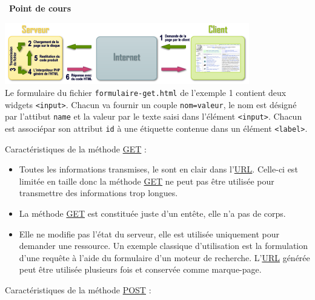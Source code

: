 \documentclass[
  11pt,
]{article}
\newcommand{\passthrough}[1]{#1}
\providecommand{\tightlist}{%
  \setlength{\itemsep}{0pt}\setlength{\parskip}{0pt}}
\newcounter{rque}
\newcounter{cours}
\newenvironment{cours}[1]
{\par \medskip   \addtocounter{cours}{1} \noindent  
\begin{bclogo}[arrondi =0.1,  ombre = true, barre=none, logo=\bcbook, marge=4]{~\textbf{Point de cours} \textbf{\thecours} {\itshape #1} }  \par}
{
\end{bclogo}
 \par \bigskip }
\begin{document}
\begin{cours}{}
\includegraphics[width=0.8\textwidth,height=\textheight]{images/Php_arch_shema.png}\\

Le formulaire du fichier \passthrough{\lstinline!formulaire-get.html!}
de l'exemple 1 contient deux widgets \passthrough{\lstinline!<input>!}.
Chacun va fournir un couple \passthrough{\lstinline!nom=valeur!}, le nom
est désigné par l'attibut \passthrough{\lstinline!name!} et la valeur
par le texte saisi dans l'élément \passthrough{\lstinline!<input>!}.
Chacun est associépar son attribut \passthrough{\lstinline!id!} à une
étiquette contenue dans un élément \passthrough{\lstinline!<label>!}.

Caractéristiques de la méthode
\href{https://developer.mozilla.org/fr/docs/Web/HTTP/M\%C3\%A9thode/GET}{GET}
:

\begin{itemize}
\tightlist
\item
  Toutes les informations transmises, le sont en clair dans
  l'\href{https://developer.mozilla.org/fr/docs/Glossaire/URL}{URL}.
  Celle-ci est limitée en taille donc la méthode
  \href{https://developer.mozilla.org/fr/docs/Web/HTTP/M\%C3\%A9thode/GET}{GET}
  ne peut pas être utilisée pour transmettre des informations trop
  longues.
\item
  La méthode
  \href{https://developer.mozilla.org/fr/docs/Web/HTTP/M\%C3\%A9thode/GET}{GET}
  est constituée juste d'un entête, elle n'a pas de corps.
\item
  Elle ne modifie pas l'état du serveur, elle est utilisée uniquement
  pour demander une ressource. Un exemple classique d'utilisation est la
  formulation d'une requête à l'aide du formulaire d'un moteur de
  recherche.
  L'\href{https://developer.mozilla.org/fr/docs/Glossaire/URL}{URL}
  générée peut être utilisée plusieurs fois et conservée comme
  marque-page.
\end{itemize}

Caractéristiques de la méthode
\href{https://developer.mozilla.org/fr/docs/Web/HTTP/M\%C3\%A9thode/POST}{POST}
:


\end{cours}
\end{document}
